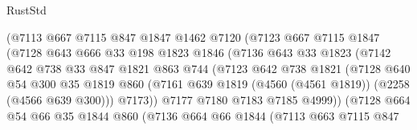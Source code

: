 \begin{lexlean}{RustStd}
\begin{coremodule}
                        (@7113
                          @667
                          @7115
                          @847
                          @1847
                          @1462
                          @7120
                          (@7123
                            @667
                            @7115
                            @1847
                            (@7128
                              @643
                              @666
                              @33
                              @198
                              @1823
                              @1846
                              (@7136
                                @643
                                @33
                                @1823
                                (@7142
                                  @642
                                  @738
                                  @33
                                  @847
                                  @1821
                                  @863
                                  @744
                                  (@7123
                                    @642
                                    @738
                                    @1821
                                    (@7128
                                      @640
                                      @54
                                      @300
                                      @35
                                      @1819
                                      @860
                                      (@7161
                                        @639
                                        @1819
                                        (@4560 (@4561 @1819))
                                        (@2258 (@4566 @639 @300)))
                                      @7173))
                                  @7177
                                  @7180
                                  @7183
                                  @7185
                                  @4999))
                              (@7128
                                @664
                                @54
                                @66
                                @35
                                @1844
                                @860
                                (@7136
                                  @664
                                  @66
                                  @1844
                                  (@7113
                                    @663
                                    @7115
                                    @847

\end{coremodule}
\end{lexlean}

